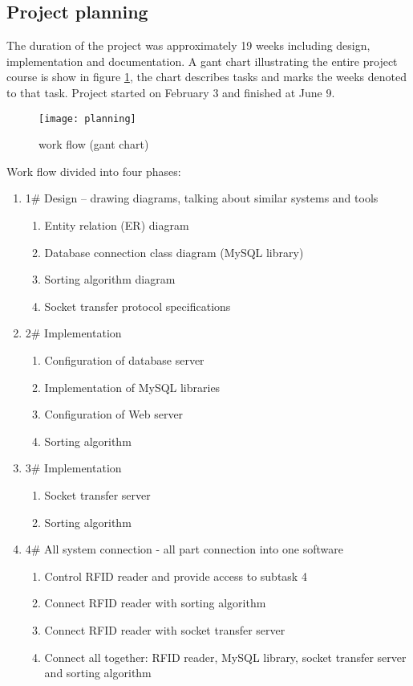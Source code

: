 \subsection{Project planning}

The duration of the project was approximately 19 weeks including design, implementation and documentation. A gant chart illustrating the entire project course is show in figure \ref{fig:planning}, the chart describes tasks and marks the weeks denoted to that task. Project started on February 3 and finished at June 9.

\begin{figure}[h]
	\centering
		\texttt{[image: planning]}
	\caption{work flow (gant chart)}
	\label{fig:planning}
\end{figure}

Work flow divided into four phases:

\begin{enumerate}
  \item 1\# Design – drawing diagrams, talking about similar systems and tools
  \begin{enumerate}
    \item Entity relation (ER) diagram
    \item Database connection class diagram (MySQL library)
    \item Sorting algorithm diagram
    \item Socket transfer protocol specifications
  \end{enumerate}
  \item 2\# Implementation
  \begin{enumerate}
    \item Configuration of database server
    \item Implementation of MySQL libraries
    \item Configuration of Web server
    \item Sorting algorithm
  \end{enumerate} 
  \item 3\# Implementation
  \begin{enumerate}
    \item Socket transfer server
    \item Sorting algorithm
  \end{enumerate}
  \item 4\# All system connection - all part connection into one software
  \begin{enumerate}
    \item Control RFID reader and provide access to subtask 4
    \item Connect RFID reader with sorting algorithm
    \item Connect RFID reader with socket transfer server
    \item Connect all together: RFID reader, MySQL library, socket transfer server and sorting algorithm
  \end{enumerate} 
\end{enumerate}


